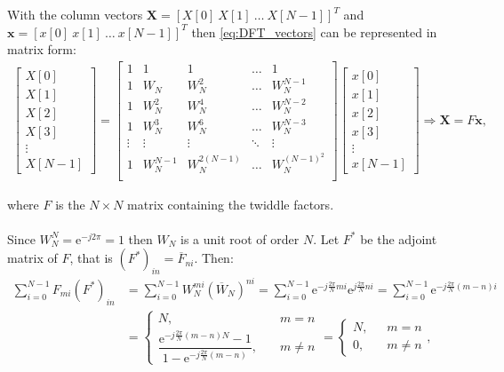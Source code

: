 With the column vectors $\textbf{X} = [X[0] \ X[1] \ \dots \ X[N-1]]^T$ and $\textbf{x} = [x[0] \ x[1] \ \dots \ x[N-1]]^T$ then \eqref{eq:DFT_vectors} can be represented in matrix form:
\begin{align} \label{eq:DFT_matrix}
	\begin{bmatrix}
		X[0]\\ X[1]\\ X[2]\\ X[3] \\ \vdots \\ X[N-1]
	\end{bmatrix}
	=
	\begin{bmatrix}
		1 & 1 	& 1   	& \hdots & 1\\
		1 & W_N 	& W_N^2 	& \hdots & W_N^{N-1} \\
		1 & W_N^2	& W_N^4	& \hdots & W_N^{N-2} \\
		1 & W_N^3	& W_N^6	& \hdots & W_N^{N-3} \\
		\vdots & \vdots & \vdots & \ddots & \vdots \\
		1 & W_N^{N-1}	& W_N^{2(N-1)}	& \hdots & 						W_N^{(N-1)^2} \\
	\end{bmatrix}
	\begin{bmatrix}
		x[0]\\ x[1]\\ x[2]\\ x[3]\\ \vdots \\ x[N-1]
	\end{bmatrix}
	\Rightarrow
	\textbf{X} = F\textbf{x},
\end{align}

where $F$ is the $N \times N$ matrix containing the twiddle factors.
\\ \\
Since $W_N^N = \text{e}^{-j2\pi} = 1$ then $W_N$ is a unit root of order $N$. Let $F^*$ be the adjoint matrix of $F$, that is $(F^*)_{in} = \overline{F}_{ni}$. Then:
\begin{align*}
\sum_{i=0}^{N-1} F_{mi} (F^*)_{in} &= \sum_{i=0}^{N-1} W_N^{mi} (\overline{W}_N)^{ni} = \sum_{i=0}^{N-1} \text{e}^{-j\frac{2\pi}{N}mi} \text{e}^{j\frac{2\pi}{N}ni} = \sum_{i=0}^{N-1} \text{e}^{-j\frac{2\pi}{N}(m-n)i} \\ &=
\begin{cases}
N, &m = n \\
\dfrac{\text{e}^{-j\frac{2\pi}{N}(m-n)N}-1}{1-\text{e}^{-j\frac{2\pi}{N}(m-n)}}, \quad &m \neq n
\end{cases} =
\begin{cases}
N, &m = n \\
0, \quad &m \neq n
\end{cases},
\end{align*}

